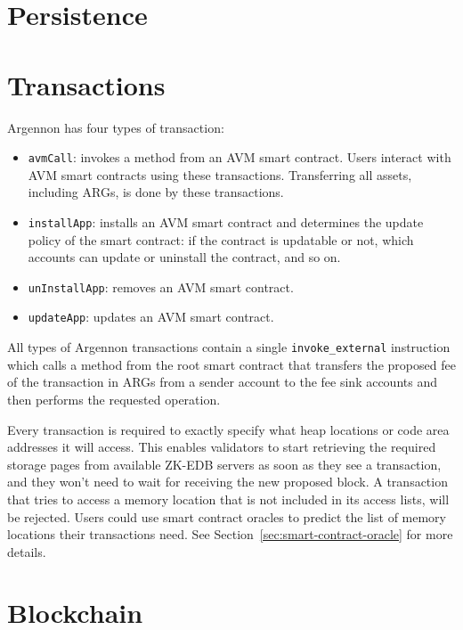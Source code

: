 

\section{Persistence}\label{sec:persistence}


\section{Transactions}\label{sec:transactions}

Argennon has four types of transaction:

\begin{itemize}
    \item \texttt{avmCall}: invokes a method from an
    AVM smart contract. Users interact with AVM smart contracts using these transactions. Transferring all
    assets, including ARGs, is done by these transactions.
    \item \texttt{installApp}: installs an AVM smart contract and determines the update policy of the smart
    contract: if the contract is updatable or not, which accounts can update or uninstall the contract, and so
    on.
    \item \texttt{unInstallApp}: removes an AVM smart contract.
    \item \texttt{updateApp}: updates an AVM smart contract.
\end{itemize}

All types of Argennon transactions contain a single \texttt{invoke\_external} instruction which calls a method
from the root smart contract that transfers the proposed fee of the transaction in ARGs from a sender account to the
fee sink accounts and then performs the requested operation.

Every transaction is required to exactly specify what heap locations or code area addresses it will access. This
enables validators to start retrieving the required storage pages from available ZK-EDB servers as soon as they
see a transaction, and they won't need to wait for receiving the new proposed block. A transaction that tries to
access a memory location that is not included in its access lists, will be rejected. Users could use smart contract
oracles to predict the list of memory locations their transactions need. See Section~\ref{sec:smart-contract-oracle}
for more details.


\section{Blockchain}\label{sec:blockchain}

